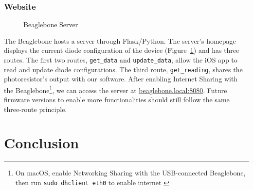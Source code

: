 \documentclass[8pt,twocolumn]{article}
\begin{document}
\subsubsection{Website}

\begin{figure}[!htp]
    \centering
    \caption{Beaglebone Server}
    \label{fig:bb_server}
\end{figure}

The Beaglebone hosts a server through Flask/Python. The server's homepage displays the current diode configuration of the device (Figure~\ref{fig:bb_server}) and has three routes. The first two routes, \texttt{get\_data} and \texttt{update\_data}, allow the iOS app to read and update diode configurations. The third route, \texttt{get\_reading}, shares the photoresistor's output with our software. After enabling Internet Sharing with the Beaglebone\footnote{On macOS, enable Networking Sharing with the USB-connected Beaglebone, then run \texttt{sudo dhclient eth0} to enable internet \cite{bb_internet}}, we can access the server at \url{beaglebone.local:8080}. Future firmware versions to enable more functionalities should still follow the same three-route principle.


\section{Conclusion}
\end{document}
